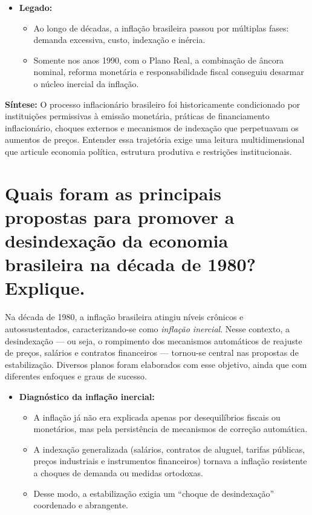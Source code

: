 \documentclass{sciposter}
\begin{document}
\begin{multicols}{3}
\begin{itemize}
    \item \textbf{ Legado:}
    \begin{itemize}
        \item Ao longo de décadas, a inflação brasileira passou por múltiplas fases: demanda excessiva, custo, indexação e inércia.
        \item Somente nos anos 1990, com o Plano Real, a combinação de âncora nominal, reforma monetária e responsabilidade fiscal conseguiu desarmar o núcleo inercial da inflação.
    \end{itemize}
\end{itemize}

\textbf{Síntese:} O processo inflacionário brasileiro foi historicamente condicionado por instituições permissivas à emissão monetária, práticas de financiamento inflacionário, choques externos e mecanismos de indexação que perpetuavam os aumentos de preços. Entender essa trajetória exige uma leitura multidimensional que articule economia política, estrutura produtiva e restrições institucionais.

\section{\textbf{Quais foram as principais propostas para promover a desindexação da economia brasileira na década de 1980? Explique.}}

Na década de 1980, a inflação brasileira atingiu níveis crônicos e autossustentados, caracterizando-se como \textit{inflação inercial}. Nesse contexto, a desindexação — ou seja, o rompimento dos mecanismos automáticos de reajuste de preços, salários e contratos financeiros — tornou-se central nas propostas de estabilização. Diversos planos foram elaborados com esse objetivo, ainda que com diferentes enfoques e graus de sucesso.

\begin{itemize}
    \item \textbf{ Diagnóstico da inflação inercial:}
    \begin{itemize}
        \item A inflação já não era explicada apenas por desequilíbrios fiscais ou monetários, mas pela persistência de mecanismos de correção automática.
        \item A indexação generalizada (salários, contratos de aluguel, tarifas públicas, preços industriais e instrumentos financeiros) tornava a inflação resistente a choques de demanda ou medidas ortodoxas.
        \item Desse modo, a estabilização exigia um “choque de desindexação” coordenado e abrangente.
    \end{itemize}


\end{itemize}
\end{multicols}
\end{document}

